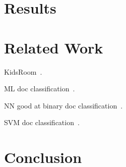 \documentclass[11pt]{article}
\begin{document}
\section{Results}

\section{Related Work}
KidsRoom~\cite{bobick1999kidsroom}. 

ML doc classification~\cite{sebastiani2002machine}.

NN good at binary doc classification~\cite{derczynski2006machine}.

SVM doc classification~\cite{isa2008text}.

\section{Conclusion}

\iffalse
\section*{Acknowledgments}
This project has received funding from the European Union’s Seventh Framework Programme for research, technological development and demonstration under grant agreement No. 611233, \textsc{Pheme}.
ah, was anything funding this? could anything be associated with this?? ahhh, erm
\fi



\end{document}
